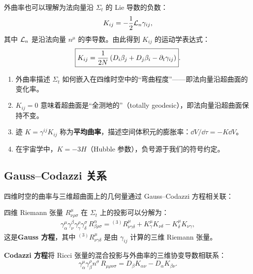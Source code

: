 外曲率也可以理解为法向量沿 $\Sigma_t$ 的 Lie 导数的负数：
\begin{equation}
    K_{ij} = -\frac{1}{2}\mathcal{L}_n \gamma_{ij},
    \label{eq:K_Lie}
\end{equation}
其中 $\mathcal{L}_n$ 是沿法向量 $n^\mu$ 的李导数。由此得到 $K_{ij}$ 的运动学表达式：
\begin{equation}
    \boxed{K_{ij} = \frac{1}{2N}\left(D_i\beta_j + D_j\beta_i - \partial_t\gamma_{ij}\right)}.
    \label{eq:K_kinematic}
\end{equation}

\begin{property}[外曲率的物理含义]
    \begin{enumerate}
        \item 外曲率描述 $\Sigma_t$ 如何嵌入在四维时空中的“弯曲程度”——即法向量沿超曲面的变化率。
        \item $K_{ij} = 0$ 意味着超曲面是“全测地的”（totally geodesic），即法向量沿超曲面保持不变。
        \item 迹 $K = \gamma^{ij}K_{ij}$ 称为\textbf{平均曲率}，描述空间体积元的膨胀率：$\dd V / \dd\tau = -K \dd V$。
        \item 在宇宙学中，$K = -3H$（Hubble 参数），负号源于我们的符号约定。
    \end{enumerate}
\end{property}

\subsection{Gauss--Codazzi 关系}

四维时空的曲率与三维超曲面上的几何量通过 Gauss--Codazzi 方程相关联：

\begin{theorem}
四维 Riemann 张量 $R^\mu_{\nu\rho\sigma}$ 在 $\Sigma_t$ 上的投影可以分解为：
\begin{align}
    \boxed{\gamma^\mu_\alpha \gamma^\beta_\nu \gamma^\rho_\gamma \gamma^\sigma_\delta \, R^\alpha_{\beta\rho\sigma} = {}^{(3)}\!R^\mu_{\nu\gamma\delta} + K^\mu_\gamma K_{\nu\delta} - K^\mu_\delta K_{\nu\gamma}},
    \label{eq:Gauss}
\end{align}
这是\textbf{Gauss 方程}，其中 ${}^{(3)}\!R^\mu_{\nu\gamma\delta}$ 是由 $\gamma_{ij}$ 计算的三维 Riemann 张量。

\textbf{Codazzi 方程}将 Ricci 张量的混合投影与外曲率的三维协变导数相联系：
\begin{equation}
    \boxed{\gamma^\mu_\alpha \gamma^\rho_\beta n^\sigma \, R_{\mu\rho\nu\sigma} = D_\beta K_{\alpha\nu} - D_\alpha K_{\beta\nu}}.
    \label{eq:Codazzi}
\end{equation}
\label{thm:Gauss_Codazzi}
\end{theorem}

